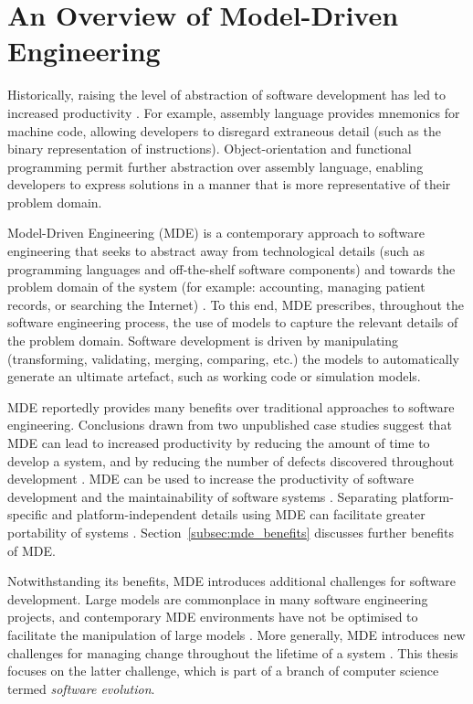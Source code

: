 
\section{An Overview of Model-Driven Engineering}
Historically, raising the level of abstraction of software development has led to increased productivity \cite{brooks86nosilverbullet,boehm06view,kelly08dsm}. For example, assembly language provides mnemonics for machine code, allowing developers to disregard extraneous detail (such as the binary representation of instructions). Object-orientation and functional programming permit further abstraction over assembly language, enabling developers to express solutions in a manner that is more representative of their problem domain.

Model-Driven Engineering (MDE) is a contemporary approach to software engineering that seeks to abstract away from technological details (such as programming languages and off-the-shelf software components) and towards the problem domain of the system (for example: accounting, managing patient records, or searching the Internet) \cite{frankel02mda,kleppe03mda,selic03pragmatics}. To this end, MDE prescribes, throughout the software engineering process, the use of models to capture the relevant details of the problem domain. Software development is driven by manipulating (transforming, validating, merging, comparing, etc.) the models to automatically generate an ultimate artefact, such as working code or simulation models.

MDE reportedly provides many benefits over traditional approaches to software engineering. Conclusions \cc drawn from two unpublished case studies suggest that MDE can lead to increased productivity by reducing the amount of time to develop a system, and by reducing the number of defects discovered throughout development \cite{watson08mdahistory}. MDE \cc can be used to increase the productivity of software development and the maintainability of software systems \cite{kleppe03mda}. Separating \cc platform-specific and platform-independent details using MDE can facilitate greater portability of systems \cite{frankel02mda}. Section~\ref{subsec:mde_benefits} discusses further benefits of MDE. 

Notwithstanding its benefits, MDE introduces additional challenges for software development. Large \cc models are commonplace in many software engineering projects, and contemporary MDE environments have not be optimised to facilitate the manipulation of large models \cite{kolovos08scalability}. More \cc generally, MDE introduces new challenges for managing change throughout the lifetime of a system \cite{Mens07}. This thesis focuses on the latter challenge, which is part of a branch of computer science termed \emph{software evolution}.

